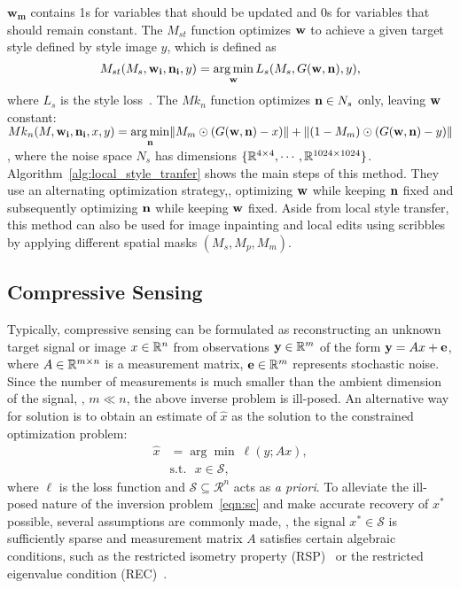$\mathbf{w_m}$ contains 1s for variables that should be updated and 0s for variables that should remain constant.
The $M_{st}$ function optimizes $\mathbf{w}$ to achieve a given target style defined by style image $y$, which is defined as
\begin{equation}
M_{st}(M_{s},\mathbf{w_i},\mathbf{n_i}, y) = \underset{\w}{\arg\min}\, L_s (M_s, G(\w, \n), y), 
\label{eqn:mst}
\end{equation}
where $L_s$ is the style loss~\cite{gatys2016image}.
The ${Mk}_{n}$ function optimizes $\mathbf{n} \in N_s$ only, leaving $\mathbf{w}$ constant: ${Mk}_{n}(M, \mathbf{w_i},\mathbf{n_i}, x, y) = \underset{\mathbf{n}}{\arg\min} \|M_m \odot (G(\mathbf{w}, \mathbf{n}) - x)\|
+ \|(1 - M_m) \odot (G(\mathbf{w}, \mathbf{n}) - y)\|$, where the noise space $N_s$ has dimensions $\{\mathbb{R}^{4\times4}, \cdots,\mathbb{R}^{1024\times1024}\}$.
Algorithm~\ref{alg:local_style_tranfer} shows the main steps of this method. 
They use an alternating optimization strategy,\ie, optimizing $\mathbf{w}$ while keeping $\mathbf{n}$ fixed and subsequently optimizing $\mathbf{n}$ while keeping $\mathbf{w}$ fixed.
Aside from local style transfer, this method can also be used for image inpainting and local edits using scribbles by applying different spatial masks $(M_s, M_p, M_m)$.

\algotransfer

\figtransfer

\subsection{Compressive Sensing}
\label{sec:compressing}
Typically, compressive sensing can be formulated as reconstructing an unknown target signal or image $x \in \mathbb{R}^{n}$ from observations $\mathbf{y} \in \mathbb{R}^{m}$ of the form $\mathbf{y}={A} x+\mathbf{e}$, where $A \in \mathbb{R}^{m \times n}$ is a measurement matrix, $\mathbf{e} \in \mathbb{R}^{m}$ represents stochastic noise.
Since the number of measurements is much smaller than the ambient dimension of the signal, \ie, $m \ll n$, the above inverse problem is ill-posed.
An alternative way for solution is to obtain an estimate of $\hat{x}$ as the solution to the constrained optimization problem:
\begin{equation}
\begin{aligned}
\hat{x} &= \arg\min~\ell(y; Ax),\\
&\text{s.t.}~~~x \in \mathcal{S},
\label{eqn:sc}
\end{aligned}   
\end{equation}
where $\ell$ is the loss function and $\mathcal{S} \subseteq \mathcal{R}^n$ acts as \emph{a priori}. 
To alleviate the ill-posed nature of the inversion problem~\eqref{eqn:sc} and make accurate recovery of $x^*$ possible, several assumptions are commonly made, \eg, the signal $x^* \in \mathcal{S}$ is sufficiently sparse and measurement matrix $A$ satisfies certain algebraic conditions, such as the restricted isometry property (RSP)~\cite{candes2006compressive} or the restricted
eigenvalue condition (REC)~\cite{donoho2006compressed}.

